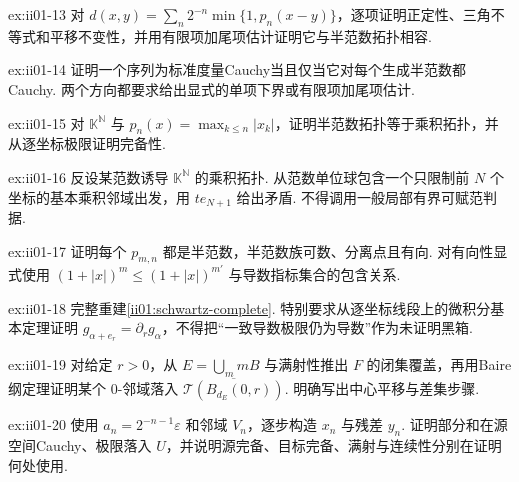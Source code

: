 \begin{FAExercise}[Fr\'echet标准度量]{ex:ii01-13}
对 \(\displaystyle d(x,y)=\sum_n2^{-n}\min\{1,p_n(x-y)\}\)，逐项证明正定性、三角不等式和平移不变性，并用有限项加尾项估计证明它与半范数拓扑相容.
\end{FAExercise}

\begin{FAExercise}[半范数Cauchy刻画]{ex:ii01-14}
证明一个序列为标准度量Cauchy当且仅当它对每个生成半范数都Cauchy. 两个方向都要求给出显式的单项下界或有限项加尾项估计.
\end{FAExercise}

\begin{FAExercise}{ex:ii01-15}
对 \(\displaystyle \mathbb K^{\mathbb N}\) 与 \(\displaystyle p_n(x)=\max_{k\leqslant n}|x_k|\)，证明半范数拓扑等于乘积拓扑，并从逐坐标极限证明完备性.
\end{FAExercise}

\begin{FAExercise}[乘积拓扑不可赋范]{ex:ii01-16}
反设某范数诱导 \(\displaystyle \mathbb K^{\mathbb N}\) 的乘积拓扑. 从范数单位球包含一个只限制前 \(\displaystyle N\) 个坐标的基本乘积邻域出发，用 \(\displaystyle te_{N+1}\) 给出矛盾. 不得调用一般局部有界可赋范判据.
\end{FAExercise}

\begin{FAExercise}[Schwartz半范数]{ex:ii01-17}
证明每个 \(\displaystyle p_{m,n}\) 都是半范数，半范数族可数、分离点且有向. 对有向性显式使用 \(\displaystyle (1+|x|)^m\leqslant(1+|x|)^{m'}\) 与导数指标集合的包含关系.
\end{FAExercise}

\begin{FAExercise}[Schwartz完备性]{ex:ii01-18}
完整重建\autoref{ii01:schwartz-complete}. 特别要求从逐坐标线段上的微积分基本定理证明 \(\displaystyle g_{\alpha+e_r}=\partial_rg_\alpha\)，不得把“一致导数极限仍为导数”作为未证明黑箱.
\end{FAExercise}

\begin{FAExercise}[Fr\'echet开映射的Baire步骤]{ex:ii01-19}
对给定 \(\displaystyle r>0\)，从 \(\displaystyle E=\bigcup_mmB\) 与满射性推出 \(\displaystyle F\) 的闭集覆盖，再用Baire纲定理证明某个 \(\displaystyle0\)-邻域落入 \(\displaystyle \overline{\mathcal T(B_{d_E}(0,r))}\). 明确写出中心平移与差集步骤.
\end{FAExercise}

\begin{FAExercise}[Fr\'echet开映射的迭代提升]{ex:ii01-20}
使用 \(\displaystyle a_n=2^{-n-1}\varepsilon\) 和邻域 \(\displaystyle V_n\)，逐步构造 \(\displaystyle x_n\) 与残差 \(\displaystyle y_n\). 证明部分和在源空间Cauchy、极限落入 \(\displaystyle U\)，并说明源完备、目标完备、满射与连续性分别在证明何处使用.
\end{FAExercise}

